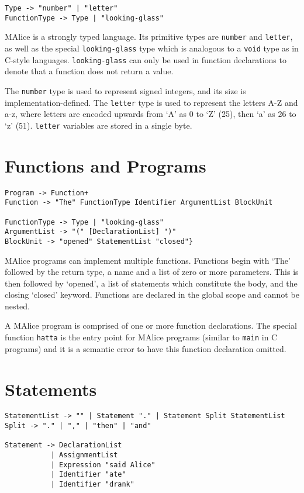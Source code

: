 \documentclass[a4wide, 11pt]{article}
\begin{document}
\begin{verbatim}
Type -> "number" | "letter"
FunctionType -> Type | "looking-glass"
\end{verbatim}

MAlice is a strongly typed language. Its primitive types are \texttt{number} and \texttt{letter}, as well as the special \texttt{looking-glass} type which is analogous to a \texttt{void} type as in C-style languages. \texttt{looking-glass} can only be used in function declarations to denote that a function does not return a value.

The \texttt{number} type is used to represent signed integers, and its size is implementation-defined. The \texttt{letter} type is used to represent the letters A-Z and a-z, where letters are encoded upwards from `A' as 0 to `Z' (25), then `a' as 26 to `z' (51). \texttt{letter} variables are stored in a single byte.

\section{Functions and Programs}

\begin{verbatim}
Program -> Function+
Function -> "The" FunctionType Identifier ArgumentList BlockUnit

FunctionType -> Type | "looking-glass"
ArgumentList -> "(" [DeclarationList] ")"
BlockUnit -> "opened" StatementList "closed"}
\end{verbatim}

MAlice programs can implement multiple functions. Functions begin with `The' followed by the return type, a name and a list of zero or more parameters. This is then followed by `opened', a list of statements which constitute the body, and the closing `closed' keyword. Functions are declared in the global scope and cannot be nested.

A MAlice program is comprised of one or more function declarations. The special function \texttt{hatta} is the entry point for MAlice programs (similar to \texttt{main} in C programs) and it is a semantic error to have this function declaration omitted.

\section{Statements}

\begin{verbatim}
StatementList -> "" | Statement "." | Statement Split StatementList
Split -> "." | "," | "then" | "and"
               
Statement -> DeclarationList
           | AssignmentList
           | Expression "said Alice"
           | Identifier "ate"
           | Identifier "drank"
\end{verbatim}
\end{document}
